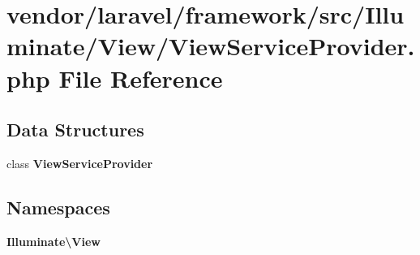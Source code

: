 \section{vendor/laravel/framework/src/\+Illuminate/\+View/\+View\+Service\+Provider.php File Reference}
\label{_view_service_provider_8php}
\subsection*{Data Structures}
\begin{DoxyCompactItemize}
\item 
class {\bf View\+Service\+Provider}
\end{DoxyCompactItemize}
\subsection*{Namespaces}
\begin{DoxyCompactItemize}
\item 
 {\bf Illuminate\textbackslash{}\+View}
\end{DoxyCompactItemize}
